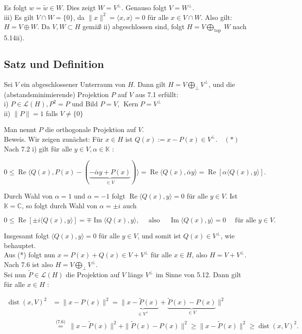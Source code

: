 \documentclass[10pt, letterpaper]{article}
\begin{document}
Es folgt $w=\tilde{w} \in W$. Dies zeigt $W=V^{\perp}$. Genauso folgt $V=W^{\perp}$.\\
iii) Es gilt $V \cap W=\{0\}$, da $\|x\|^{2}=\langle x, x\rangle=0$ für alle $x \in V \cap W$. Also gilt: $H=V \oplus W$. Da $V, W \subset H$ gemäß ii) abgeschlossen sind, folgt $H=V \bigoplus_{\text {top }} W$ nach 5.14ii).

\subsection*{Satz und Definition}
Sei $V$ ein abgeschlossener Unterraum von $H$. Dann gilt $H=V \bigoplus_{\perp} V^{\perp}$, und die (abstandsminimierende) Projektion $P$ auf $V$ aus 7.1 erfüllt:\\
i) $P \in \mathcal{L}(H), P^{2}=P$ und Bild $P=V$, $\operatorname{Kern} P=V^{\perp}$\\
ii) $\|P\|=1$ falls $V \neq\{0\}$

Man nennt $P$ die orthogonale Projektion auf $V$.\\
Beweis. Wir zeigen zunächst: Für $x \in H$ ist $Q(x):=x-P(x) \in V^{\perp} . \quad(*)$ Nach 7.2 i) gilt für alle $y \in V, \alpha \in \mathbb{K}$ :

$$
0 \leq \operatorname{Re}\langle Q(x), P(x)-(\underbrace{-\bar{\alpha} y+P(x)}_{\in V})\rangle=\operatorname{Re}\langle Q(x), \bar{\alpha} y\rangle=\operatorname{Re}[\alpha\langle Q(x), y\rangle] .
$$

Durch Wahl von $\alpha=1$ und $\alpha=-1$ folgt $\operatorname{Re}\langle Q(x), y\rangle=0$ für alle $y \in V$. Ist $\mathbb{K}=\mathbb{C}$, so folgt durch Wahl von $\alpha= \pm i$ auch

$$
0 \leq \operatorname{Re}[ \pm i\langle Q(x), y\rangle]=\mp \operatorname{Im}\langle Q(x), y\rangle, \quad \text { also } \quad \operatorname{Im}\langle Q(x), y\rangle=0 \quad \text { für alle } y \in V .
$$

Insgesamt folgt $\langle Q(x), y\rangle=0$ für alle $y \in V$, und somit ist $Q(x) \in V^{\perp}$, wie behauptet.\\
Aus (*) folgt nun $x=P(x)+Q(x) \in V+V^{\perp}$ für alle $x \in H$, also $H=V+V^{\perp}$. Nach 7.6 ist also $H=V \bigoplus_{\perp} V^{\perp}$.\\
Sei nun $\widetilde{P} \in \mathcal{L}(H)$ die Projektion auf $V$ längs $V^{\perp}$ im Sinne von 5.12. Dann gilt für alle $x \in H$ :

$$
\begin{aligned}
\operatorname{dist}(x, V)^{2} & =\|x-P(x)\|^{2}=\|\underbrace{x-\widetilde{P}(x)}_{\in V^{\perp}}+\underbrace{\widetilde{P}(x)-P(x)}_{\in V}\|^{2} \\
& \stackrel{\text { (7.6) }}{=}\|x-\widetilde{P}(x)\|^{2}+\|\widetilde{P}(x)-P(x)\|^{2} \geq\|x-\widetilde{P}(x)\|^{2} \geq \operatorname{dist}(x, V)^{2} .
\end{aligned}
$$
\end{document}
